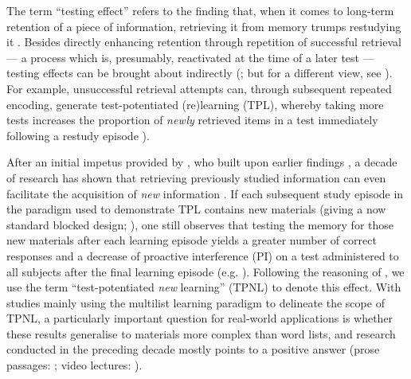 \documentclass[../main.tex]{subfiles}
\begin{document}
The term ``testing effect'' refers to the finding that, when it comes to 
long-term retention of a piece of information, retrieving it from memory 
trumps restudying it 
\citep{karpickeCriticalImportanceRetrieval2008,roedigeriiiPowerTestingMemory2006,
 roedigeriiiTestEnhancedLearningTaking2006, rowlandEffectTestingRestudy2014, 
adesopeRethinkingUseTests2017, roedigeriiiCriticalRoleRetrieval2011, 
gloverTestingPhenomenonNot1989}. Besides directly enhancing retention 
through repetition of successful retrieval --- a process which is, presumably, 
reactivated at the time of a later test --- testing effects can be brought 
about indirectly (\citealp{arnoldTestpotentiatedLearningDistinguishing2013, 
roedigeriiiPowerTestingMemory2006}; but for a different view, see 
\citealp{kornellRetrievalAttemptsEnhance2015}). For example, unsuccessful 
retrieval attempts can, through subsequent repeated encoding, generate 
test-potentiated (re)learning (TPL), whereby taking more tests increases the 
proportion of \textit{newly} retrieved items in a test immediately following a 
restudy episode 
\citealp{izawaReinforcementTestSequencesPairedAssociate1966,izawaOptimalPotentiatingEffects1970,
 kornellUnsuccessfulRetrievalAttempts2009, arnoldFreeRecallEnhances2013, 
arnoldTestpotentiatedLearningDistinguishing2013, 
wissmanTestpotentiatedLearningThree2018}).

After an initial impetus provided by 
\cite{szpunarTestingStudyInsulates2008}, who built upon earlier findings 
\citep{darleyEffectsPriorFree1971, tulvingNegativeTransferEffects1974}, a 
decade of research has shown that retrieving previously studied information 
can even facilitate the acquisition of \textit{new} information 
\citep{chanRetrievalPotentiatesNew2018, 
pastotterRetrievalPracticeEnhances2014, yangEnhancingLearningRetrieval2018}. 
If each subsequent study episode in the paradigm used to demonstrate TPL 
contains new materials (giving a now standard blocked design; 
\citealp{chanTestingPotentiatesNew2018}), one still observes that testing 
the memory for those new materials after each learning episode yields a 
greater number of correct responses and a decrease of proactive interference 
(PI) on a test administered to all subjects after the final learning episode 
(e.g. \citealp{szpunarInterpolatedMemoryTests2013, 
szpunarTestingStudyInsulates2008, wissmanInterimTestEffect2011}). Following 
the reasoning of \cite{chanRetrievalPotentiatesNew2018}, we use the term 
``test-potentiated \textit{new} learning'' (TPNL) to denote this effect.
With studies mainly using the multilist learning paradigm to delineate the 
scope of TPNL, a particularly important question for real-world applications 
is whether these results generalise to materials more complex than word 
lists, and research conducted in the preceding decade mostly points to a 
positive answer (prose passages: \citealp{wissmanInterimTestEffect2011, 
divisRetrievalSpeedsContext2014}; video lectures: 
\citealp{szpunarInterpolatedMemoryTests2013, 
jingInterpolatedTestingInfluences2016}). 
\end{document}
